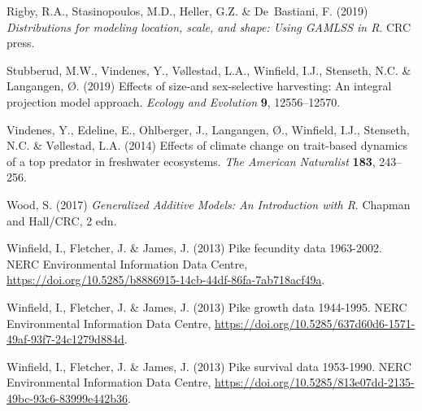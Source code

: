 \documentclass[12pt]{article}
\begin{document}
\begin{spacing}{1.35}
\begin{thebibliography}{62}
		Rigby, R.A., Stasinopoulos, M.D., Heller, G.Z. \& De~Bastiani, F. (2019)
		\emph{Distributions for modeling location, scale, and shape: Using GAMLSS in
			R}. CRC press.
			
		Stubberud, M.W., Vindenes, Y., V{\o}llestad, L.A., Winfield, I.J., Stenseth,
		N.C. \& Langangen, {\O}. (2019) Effects of size-and sex-selective harvesting:
		An integral projection model approach. \emph{Ecology and Evolution}
		\textbf{9}, 12556--12570.
		
		Vindenes, Y., Edeline, E., Ohlberger, J., Langangen, {\O}., Winfield, I.J.,
		Stenseth, N.C. \& V{\o}llestad, L.A. (2014) Effects of climate change on
		trait-based dynamics of a top predator in freshwater ecosystems. \emph{The
			American Naturalist} \textbf{183}, 243--256.
		
		Wood, S. (2017) \emph{Generalized Additive Models: An Introduction with R}.
		Chapman and Hall/CRC, 2 edn.
		
		Winfield, I., Fletcher, J. \& James, J. (2013{}) Pike fecundity
		data 1963-2002. NERC Environmental Information Data Centre,
		\url{https://doi.org/10.5285/b8886915-14cb-44df-86fa-7ab718acf49a}.
		
		Winfield, I., Fletcher, J. \& James, J. (2013{}) Pike growth data
		1944-1995. NERC Environmental Information Data Centre, \url{
			https://doi.org/10.5285/637d60d6-1571-49af-93f7-24c1279d884d}.
		
		Winfield, I., Fletcher, J. \& James, J. (2013{}) Pike survival data
		1953-1990. NERC Environmental Information Data Centre,
		\url{https://doi.org/10.5285/813e07dd-2135-49bc-93c6-83999e442b36}.
		
	\end{thebibliography}

\end{spacing} 
\end{document}
